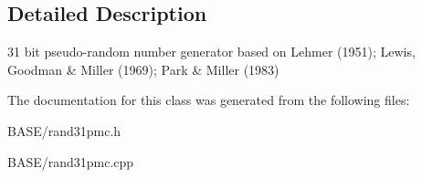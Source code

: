 \subsection{Detailed Description}
31 bit pseudo-\/random number generator based on Lehmer (1951); Lewis, Goodman \& Miller (1969); Park \& Miller (1983) 

The documentation for this class was generated from the following files\+:\begin{DoxyCompactItemize}
\item 
B\+A\+S\+E/rand31pmc.\+h\item 
B\+A\+S\+E/rand31pmc.\+cpp\end{DoxyCompactItemize}
